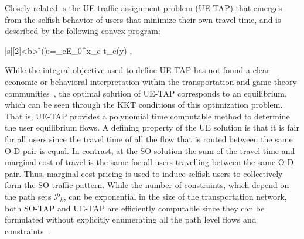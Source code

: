 \documentclass{article}
\newif\ifarxiv   %
\begin{document}

\ifarxiv
Closely related to SO-TAP is the UE traffic assignment problem (UE-TAP) that emerges from the selfish behavior of users, where each user strives to minimize its own travel time, without regard to the effect that it has on the overall travel time of all the users in the system. This behavior is captured through the following convex program:
\else
Closely related is the UE traffic assignment problem (UE-TAP) that emerges from the selfish behavior of users that minimize their own travel time, and is described by the following convex program:
\fi
\begin{definition}
\begin{mini!}|s|[2]<b>
	{\f}{\objue():=\sum_{e\in E}\int_{0}^{x_e} t_e(y) , \label{eq:ue-obj}}
	{}
	{}
\end{mini!}
\end{definition}
\begin{comment}
\begin{definition}[Program for UE-TAP \cite{Sheffi1985}]
\begin{mini!}|s|[2]<b>
	{\f \in \Omega}{\objue(\mathbf{x}):=\sum_{e\in E}\int_{0}^{x_e} t_e(y) \dd{y}, \label{eq:ue-obj}}
	{}
	{}
\end{mini!}
\end{definition}
\end{comment}

While the integral objective used to define UE-TAP has not found a clear economic or behavioral interpretation within the transportation and game-theory communities~\cite{Sheffi1985}, the optimal solution of UE-TAP corresponds to an equilibrium, which can be seen through the KKT conditions of this optimization problem. That is, UE-TAP provides a polynomial time computable method to determine the user equilibrium flows. A defining property of the UE solution is that it is fair for all users since the travel time of all the flow that is routed between the same O-D pair is equal. In contrast, at the SO solution the sum of the travel time and marginal cost of travel is the same for all users travelling between the same O-D pair. Thus, marginal cost pricing is used to induce selfish users to collectively form the SO traffic pattern. While the number of constraints, which depend on the path sets $\mathcal{P}_k$, can be exponential in the size of the transportation network, both SO-TAP and UE-TAP are efficiently computable since they can be formulated without explicitly enumerating all the path level flows and constraints~\cite{Sheffi1985}.
\end{document}
